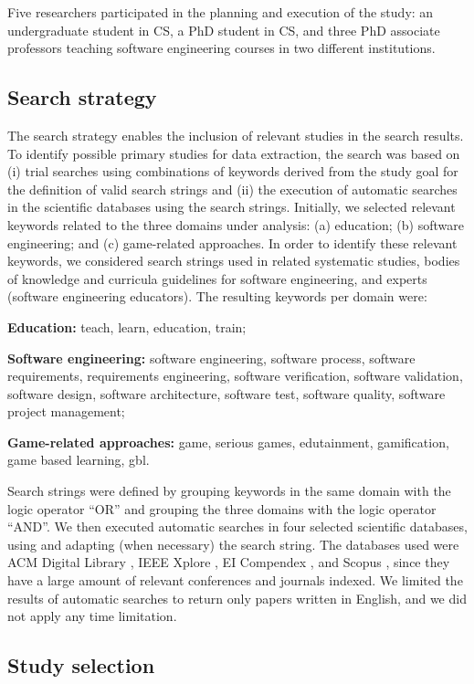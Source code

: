 Five researchers participated in the planning and execution of the study: an undergraduate student in CS, a PhD student in CS, and three PhD associate professors teaching software engineering courses in two different institutions.

\subsection{Search strategy}
\label{sec:smssearch}

The search strategy enables the inclusion of relevant studies in the search results. To identify possible primary studies for data extraction, the search was based on (i) trial searches using combinations of keywords derived from the study goal for the definition of valid search strings and (ii) the execution of automatic searches in the scientific databases using the search strings. 	Initially, we selected relevant keywords related to the three domains under analysis: (a) education; (b) software engineering; and (c) game-related approaches. In order to identify these relevant keywords, we considered search strings used in related systematic studies, bodies of knowledge and curricula guidelines for software engineering, and experts (software engineering educators). The resulting keywords per domain were:

\textbf{Education:} teach, learn, education, train;

\textbf{Software engineering:} software engineering, software process, software requirements, requirements engineering, software verification, software validation, software design, software architecture, software test, software quality, software project management;

\textbf{Game-related approaches:} game, serious games, edutainment, gamification, game based learning, gbl.

Search strings were defined by grouping keywords in the same domain with the logic operator “OR” and grouping the three domains with the logic operator “AND”. We then executed automatic searches in four selected scientific databases, using and adapting (when necessary) the search string. The databases used were ACM Digital Library , IEEE Xplore , EI Compendex , and Scopus , since they have a large amount of relevant conferences and journals indexed. We limited the results of automatic searches to return only papers written in English, and we did not apply any time limitation.

\subsection{Study selection}
\label{sec:smsselection}

